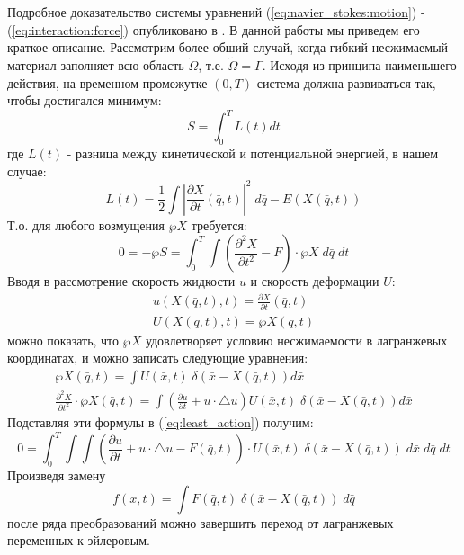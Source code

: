 Подробное доказательство системы уравнений (\ref{eq:navier_stokes:motion}) -
(\ref{eq:interaction:force}) опубликовано в \cite{peskin2002immersed}.  В
данной работы мы приведем его краткое описание. Рассмотрим более обший случай,
когда гибкий несжимаемый материал заполняет всю область $\tilde{\Omega}$, т.е.
$\tilde{\Omega} = \Gamma$.  Исходя из принципа наименьшего действия, на
временном промежутке $(0, T)$ система должна развиваться так, чтобы достигался
минимум:
\begin{equation}
    S = \int_0^T L(t) dt
\end{equation}
где $L(t)$ - разница между кинетической и потенциальной энергией, в нашем случае:
\begin{equation}
    \label{eq:least_action}
    L(t) = \frac{1}{2} \int \left| \frac{\partial X}{\partial t}(\bar{q}, t) \right|^2 \; d\bar{q} - E(X(\bar{q}, t))
\end{equation}
Т.о. для любого возмущения $\wp X$ требуется:
\begin{equation}
    0 = -\wp S = \int_0^T \int \left( \frac{\partial^2 X}{\partial t^2} - F \right) \cdot \wp X \; d\bar{q} \; dt
\end{equation}
Вводя в рассмотрение скорость жидкости $u$ и скорость деформации $U$:
\begin{gather}
    u(X(\bar{q}, t), t) = \frac{\partial X}{\partial t}(\bar{q}, t) \\
    U(X(\bar{q}, t), t) = \wp X(\bar{q}, t)
\end{gather}
можно показать, что $\wp X$ удовлетворяет условию несжимаемости в лагранжевых
координатах, и можно записать следующие уравнения:
\begin{gather}
    \wp X(\bar{q}, t) = \int U(\bar{x}, t) \; \delta(\bar{x} - X(\bar{q}, t)) d\bar{x} \\
    \frac{\partial^2 X}{\partial t^2} \cdot \wp X(\bar{q}, t) = \int  \left(\frac{\partial u}{\partial t} + u \cdot \triangle u \right) U(\bar{x}, t) \; \delta(\bar{x} - X(\bar{q}, t)) d\bar{x}
\end{gather}
Подставляя эти формулы в (\ref{eq:least_action}) получим:
\begin{equation}
    0 = \int_0^T \int \int \left( \frac{\partial u}{\partial t} + u \cdot \triangle u - F(\bar{q}, t) \right) \cdot U(\bar{x}, t) \; \delta(\bar{x} - X(\bar{q}, t)) \; d\bar{x} \; d\bar{q} \; dt
\end{equation}
Произведя замену
\begin{equation}
    f(x, t) = \int F(\bar{q}, t) \; \delta(\bar{x} - X(\bar{q}, t)) \; d\bar{q}
\end{equation}
после ряда преобразований можно завершить переход от лагранжевых переменных к
эйлеровым.

